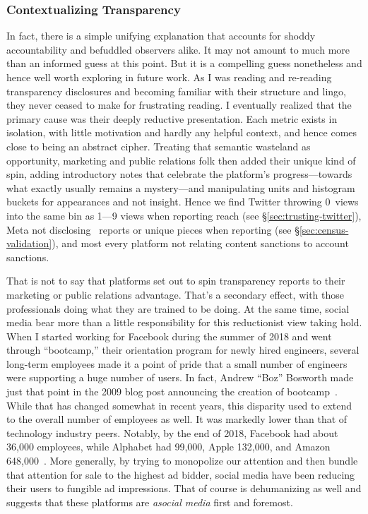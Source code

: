 \subsubsection{Contextualizing Transparency}

In fact, there is a simple unifying explanation that accounts for shoddy
accountability and befuddled observers alike. It may not amount to much more
than an informed guess at this point. But it is a compelling guess nonetheless
and hence well worth exploring in future work. As I was reading and re-reading
transparency disclosures and becoming familiar with their structure and lingo,
they never ceased to make for frustrating reading. I eventually realized that
the primary cause was their deeply reductive presentation. Each metric exists in
isolation, with little motivation and hardly any helpful context, and hence
comes close to being an abstract cipher. Treating that semantic wasteland as
opportunity, marketing and public relations folk then added their unique kind of
spin, adding introductory notes that celebrate the platform's progress---towards
what exactly usually remains a mystery---and manipulating units and histogram
buckets for appearances and not insight. Hence we find Twitter throwing 0~views
into the same bin as 1—9 views when reporting reach (see
\S\ref{sec:trusting-twitter}), Meta not disclosing \NCMEC\ reports or unique
pieces when reporting \CSAM (see \S\ref{sec:census-validation}), and most every
platform not relating content sanctions to account sanctions.

That is not to say that platforms set out to spin transparency reports to their
marketing or public relations advantage. That's a secondary effect, with those
professionals doing what they are trained to be doing. At the same time, social
media bear more than a little responsibility for this reductionist view taking
hold. When I started working for Facebook during the summer of 2018 and went
through ``bootcamp,'' their orientation program for newly hired engineers,
several long-term employees made it a point of pride that a small number of
engineers were supporting a huge number of users. In fact, Andrew ``Boz''
Bosworth made just that point in the 2009 blog post announcing the creation of
bootcamp~\cite{Bosworth2009}. While that has changed somewhat in recent years,
this disparity used to extend to the overall number of employees as well. It was
markedly lower than that of technology industry peers. Notably, by the end of
2018, Facebook had about 36,000 employees, while Alphabet had 99,000, Apple
132,000, and Amazon
648,000~\cite{MacrotrendsAlphabet,MacrotrendsAmazon,MacrotrendsApple,MacrotrendsMeta}.
More generally, by trying to monopolize our attention and then bundle that
attention for sale to the highest ad bidder, social media have been reducing
their users to fungible ad impressions. That of course is dehumanizing as well
and suggests that these platforms are \emph{asocial media} first and foremost.

